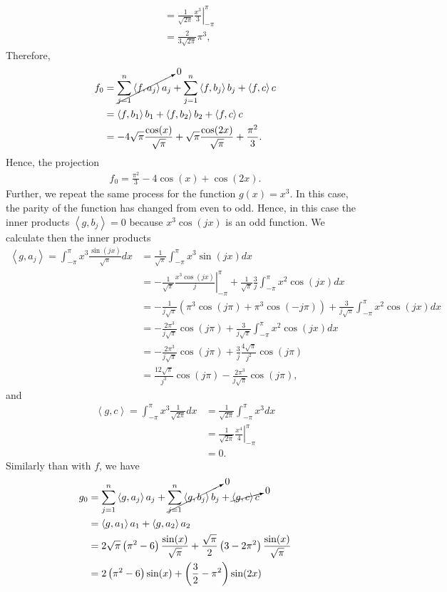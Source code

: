 \begin{questions}
\begin{solution}
\begin{align*}
&=\frac{1}{\sqrt{2\pi}}\left.\frac{x^3}{3}\right|_{-\pi}^{\pi} \\
&=\frac{2}{3\sqrt{2\pi}}\pi^3,
\end{align*}
Therefore,
\begin{align*}
f_0&=\cancelto{0}{\sum_{j=1}^n\left<f,a_j\right>a_j}+\sum_{j=1}^n\left<f,b_j\right>b_j+\left<f,c\right>c\\
&=\left<f,b_1\right>b_1+\left<f,b_2\right>b_2+\left<f,c\right>c\\
&=-4\sqrt{\pi}\frac{\cos(x)}{\sqrt{\pi}}+\sqrt{\pi}\frac{\cos(2x)}{\sqrt{\pi}}+\frac{\pi^2}{3}.
\end{align*}
Hence, the projection
\begin{align*}
f_0=\frac{\pi^2}{3}-4\cos(x)+\cos(2x).
\end{align*}
Further, we repeat the same process for the function $g(x)=x^3$. In this case, the parity of the function has changed from even to odd. Hence, in this case the inner products $\left<g,b_j\right>=0$ because $x^3\cos(jx)$ is an odd function.
We calculate then the inner products
\begin{align*}
\left<g,a_j\right>=\int_{-\pi}^{\pi}x^3\frac{\sin(jx)}{\sqrt{\pi}}dx&=\frac{1}{\sqrt{\pi}}\int_{-\pi}^{\pi}x^3\sin(jx)dx\\
&=-\frac{1}{\sqrt{\pi}}\left.\frac{x^3\cos(jx)}{j}\right|_{-\pi}^{\pi}+\frac{1}{\sqrt{\pi}}\frac{3}{j}\int_{-\pi}^{\pi}x^2\cos(jx)dx\\
&=-\frac{1}{j\sqrt{\pi}}\left(\pi^3\cos(j\pi)+\pi^3\cos(-j\pi)\right)+\frac{3}{j\sqrt{\pi}}\int_{-\pi}^{\pi}x^2\cos(jx) dx\\
&=-\frac{2\pi^3}{j\sqrt{\pi}}\cos(j\pi)+\frac{3}{j\sqrt{\pi}}\int_{-\pi}^{\pi}x^2\cos(jx) dx\\
&=-\frac{2\pi^3}{j\sqrt{\pi}}\cos(j\pi)+\frac{3}{j}\frac{4\sqrt{\pi}}{j^2}\cos(j\pi)\\
&=\frac{12\sqrt{\pi}}{j^3}\cos(j\pi)-\frac{2\pi^3}{j\sqrt{\pi}}\cos(j\pi),
\end{align*}
and
\begin{align*}
\left<g,c\right>=\int_{-\pi}^{\pi}x^3\frac{1}{\sqrt{2\pi}}dx&=\frac{1}{\sqrt{2\pi}}\int_{-\pi}^{\pi}x^3dx\\
&=\frac{1}{\sqrt{2\pi}}\left.\frac{x^4}{4}\right|_{-\pi}^{\pi}\\
&=0.
\end{align*}
Similarly than with $f$, we have
\begin{align*}
g_0&=\sum_{j=1}^n\left<g,a_j\right>a_j+\cancelto{0}{\sum_{j=1}^n\left<g,b_j\right>b_j}+\cancelto{0}{\left<g,c\right>c}\\
&=\left<g,a_1\right>a_1+\left<g,a_2\right>a_2\\
&=2\sqrt{\pi}\left(\pi^2-6\right)\frac{\text{sin}(x)}{\sqrt{\pi}}+\frac{\sqrt{\pi}}{2}\left(3-2\pi^2\right)\frac{\text{sin}(x)}{\sqrt{\pi}}\\
&=2\left(\pi^2-6\right)\text{sin}(x)+\left(\frac{3}{2}-\pi^2\right)\text{sin}(2x)
\end{align*}
\end{solution}
\end{questions}
